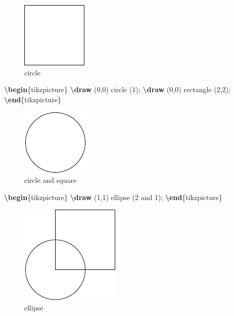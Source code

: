 \documentclass[
]{book}
\newenvironment{Shaded}{\begin{snugshade}}{\end{snugshade}}
\newcommand{\ExtensionTok}[1]{#1}
\newcommand{\FunctionTok}[1]{\textcolor[rgb]{0.13,0.29,0.53}{\textbf{#1}}}
\newcommand{\KeywordTok}[1]{\textcolor[rgb]{0.13,0.29,0.53}{\textbf{#1}}}
\newcommand{\NormalTok}[1]{#1}
\theoremstyle{definition}
\theoremstyle{definition}
\theoremstyle{definition}
\theoremstyle{definition}
\theoremstyle{remark}
\begin{document}
\begin{figure}
\includegraphics[width=0.25\linewidth]{202401311000-TikZ_files/figure-latex/unnamed-chunk-22-1} \caption{circle}\label{fig:unnamed-chunk-22}
\end{figure}

\begin{Shaded}
\begin{Highlighting}[]
\KeywordTok{\textbackslash{}begin}\NormalTok{\{}\ExtensionTok{tikzpicture}\NormalTok{\}}
  \FunctionTok{\textbackslash{}draw}\NormalTok{ (0,0) circle (1);}
  \FunctionTok{\textbackslash{}draw}\NormalTok{ (0,0) rectangle (2,2);}
\KeywordTok{\textbackslash{}end}\NormalTok{\{}\ExtensionTok{tikzpicture}\NormalTok{\}}
\end{Highlighting}
\end{Shaded}

\begin{figure}
\includegraphics[width=0.25\linewidth]{202401311000-TikZ_files/figure-latex/unnamed-chunk-24-1} \caption{circle and square}\label{fig:unnamed-chunk-24}
\end{figure}

\begin{Shaded}
\begin{Highlighting}[]
\KeywordTok{\textbackslash{}begin}\NormalTok{\{}\ExtensionTok{tikzpicture}\NormalTok{\}}
  \FunctionTok{\textbackslash{}draw}\NormalTok{ (1,1) ellipse (2 and 1);}
\KeywordTok{\textbackslash{}end}\NormalTok{\{}\ExtensionTok{tikzpicture}\NormalTok{\}}
\end{Highlighting}
\end{Shaded}

\begin{figure}
\includegraphics[width=0.25\linewidth]{202401311000-TikZ_files/figure-latex/unnamed-chunk-26-1} \caption{ellipse}\label{fig:unnamed-chunk-26}
\end{figure}
\end{document}
